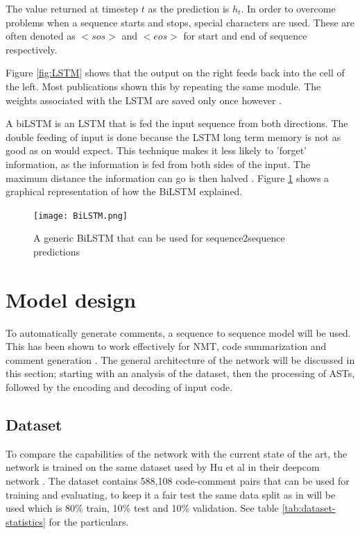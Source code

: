 \documentclass[a4paper,10pt]{article}
\theoremstyle{plain}
\theoremstyle{definition}
\begin{document}
\begin{multicols*}{2}
The value returned at timestep $t$ as the prediction is $h_t$. In order to overcome problems when a sequence starts and stops, special characters are used. These are often denoted as $<sos>$ and $<eos>$ for start and end of sequence respectively.

Figure \ref{fig:LSTM} shows that the output on the right feeds back into the cell of the left. Most publications shown this by repeating the same module. The weights associated with the LSTM are saved only once however \cite{hochreiter1997lstm}.

A biLSTM is an LSTM that is fed the input sequence from both directions. The double feeding of input is done because the LSTM long term memory is not as good as on would expect\cite{BiLSTM}. This technique makes it less likely to 'forget' information, as the information is fed from both sides of the input. The maximum distance the information can go is then halved \cite{BiLSTM}. Figure \ref{fig:BiLSTM} shows a graphical representation of how the BiLSTM explained.

\begin{figure}[H]
    \centering
    \texttt{[image: BiLSTM.png]}
    \caption{A generic BiLSTM that can be used for sequence2sequence predictions}
    \label{fig:BiLSTM}
\end{figure}{}

\section{Model design}
\label{design}
To automatically generate comments, a sequence to sequence model will be used. This has been shown to work effectively for NMT\cite{nguyen-le-etal-2017-improving}, code summarization \cite{alon2018code2seq} and comment generation \cite{hu2018deep} \cite{Hu2019}. The general architecture of the network will be discussed in this section; starting with an analysis of the dataset, then the processing of ASTs, followed by the encoding and decoding of input code.



\subsection{Dataset}
\label{dataset}
To compare the capabilities of the network with the current state of the art, the network is trained on the same dataset used by Hu et al in their deepcom network \cite{hu2018deep}. The dataset contains 588,108 code-comment pairs that can be used for training and evaluating, to keep it a fair test the same data split as in \cite{hu2018deep} will be used which is 80\% train, 10\% test and 10\% validation. See table \ref{tab:dataset-statistics} for the particulars.


\end{multicols*}
\end{document}
